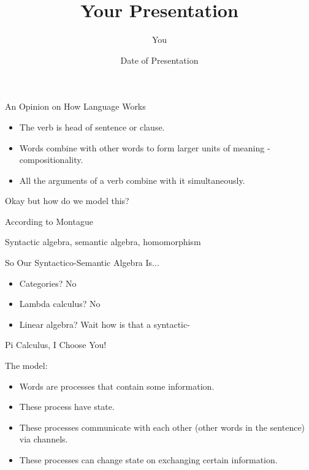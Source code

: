 \documentclass{beamer}
\title[Your Short Title]{Your Presentation}
\author{You}
\institute{Where You're From}
\date{Date of Presentation}
\begin{document}
\begin{frame}
  \titlepage
\end{frame}



\begin{frame}{An Opinion on How Language Works}

\begin{itemize}
\item
The verb is head of sentence or clause.
\item
Words combine with other words to form larger units of meaning - compositionality.
\item
All the arguments of a verb combine with it simultaneously.
\end{itemize}

Okay but how do we model this?

\end{frame}


\begin{frame}{According to Montague}

Syntactic algebra, semantic algebra, homomorphism

\end{frame}


\begin{frame}{So Our Syntactico-Semantic Algebra Is...}

\begin{itemize}
\item
Categories? No
\item
Lambda calculus? No
\item
Linear algebra? Wait how is that a syntactic-
\end{itemize}

\end{frame}


\begin{frame}{Pi Calculus, I Choose You!}

The model:

\begin{itemize}
\item
Words are processes that contain some information.
\item
These process have state.
\item
These processes communicate with each other (other words in the sentence) via channels.
\item
These processes can change state on exchanging certain information.
\end{itemize}

\end{frame}
\end{document}
